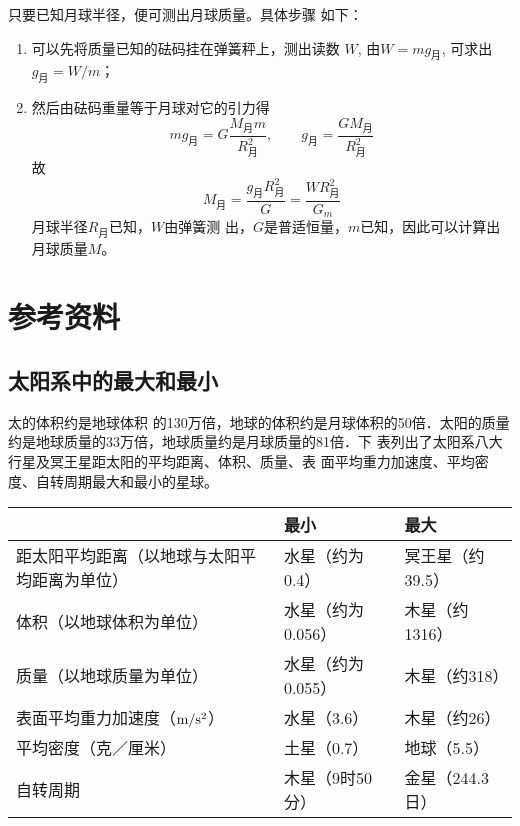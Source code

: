 \begin{enumerate}
	\begin{solution}
只要已知月球半径，便可测出月球质量。具体步骤
如下：
\begin{enumerate}
\item 可以先将质量已知的砝码挂在弹簧秤上，测出读数
$W$, 由$W=mg_{\text{月}}$, 可求出$g_{\text{月}}=W/m$；
\item 然后由砝码重量等于月球对它的引力得
\[mg_{\text{月}}=G\frac{M_{\text{月}}m}{R^2_{\text{月}}},\qquad g_{\text{月}}=\frac{GM_{\text{月}}}{R^2_{\text{月}}}\]
故
\[M_{\text{月}}=\frac{g_{\text{月}}R^2_{\text{月}}}{G}=\frac{WR^2_{\text{月}}}{G_m}\]
月球半径$R_{\text{月}}$已知，$W$由弹簧测
出，$G$是普适恒量，$m$已知，因此可以计算出月球质量$M$。
\end{enumerate}


	\end{solution}
	

\end{enumerate}
	
	
\section{参考资料}
\subsection{太阳系中的最大和最小}

太的体积约是地球体积
的130万倍，地球的体积约是月球体积的50倍．太阳的质量
约是地球质量的33万倍，地球质量约是月球质量的81倍．下
表列出了太阳系八大行星及冥王星距太阳的平均距离、体积、质量、表
面平均重力加速度、平均密度、自转周期最大和最小的星球。

\begin{center}
\begin{tabular}{p{}p{}p{}}
\hline
&  最小  &最大\\
\hline
距太阳平均距离（以地球与太阳平均距离为单位） & 水星（约为0.4）&冥王星（约39.5）\\
体积（以地球体积为单位） & 水星（约为0.056）&木星（约1316）\\
质量（以地球质量为单位） & 水星（约为0.055）&木星（约318）\\
表面平均重力加速度（$\text{m}/\text{s}^2$）&  水星（3.6）&木星（约26）\\
平均密度（克／厘米）& 土星（0.7）&地球（5.5）\\
自转周期&木星（9时50分）& 金星（244.3日）\\
\hline
\end{tabular}
\end{center}

